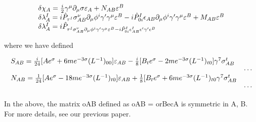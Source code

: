 \documentclass{article}
\begin{document}
\begin{equation}
\begin{array}{l l}{{\delta\chi_{A}=\frac{i}{2}\gamma^{\mu}\partial_{\mu}\sigma\varepsilon_{A}+N_{A B}\varepsilon^{B}}}\\ {{\delta\lambda_{A}^{I}=i\hat{P}_{\tau^{I}}\sigma_{A B}^{\nu}\partial_{\mu}\phi^{i}\gamma^{\prime}\gamma^{\mu}\varepsilon^{B}-i\hat{P}_{0i}^{I}\epsilon_{A B}\partial_{\mu}\phi^{i}\gamma^{\prime}\gamma^{\mu}\varepsilon^{B}+M_{A B}\varepsilon^{B}}}\\ {{\delta\lambda_{A}^{I}=i\hat{P}_{\tau^{I}\sigma_{A B}^{\nu}\partial_{\mu}\phi^{i}\gamma^{\prime}\gamma^{\mu}\varepsilon^{B}-i\hat{P}_{0i}^{I}\epsilon_{A B}^{I}\epsilon^{\prime}\gamma^{\prime}\epsilon^{B}}}}\end{array}
\end{equation}


where we have defined


\begin{equation}
\begin{array}{l l}{{S_{A B}=\frac{i}{24}[A e^{\sigma}+6m e^{-3\sigma}(L^{-1})_{00}]\varepsilon_{A B}-\frac{i}{8}[B_{t}e^{\sigma}-2m e^{-3\sigma}(L^{-1})_{t0}]\gamma^{7}\sigma_{A B}^{t}}}\\ {{\phantom{\qquad}}}&{{\cdots}}\\ {{N_{A B}=\frac{1}{24}[A e^{\sigma}-18m e^{-3\sigma}(L^{-1})_{t0}]\varepsilon_{A B}+\frac{1}{8}[B_{t}e^{\sigma}+6m e^{-3\sigma}(L^{-1})_{t0}\gamma^{7}\sigma_{A B}^{t}}}\\ {{\phantom{\qquad}}}&{{\cdots}}\end{array}
\end{equation}


In the above, the matrix oAB defined as oAB = orBecA is symmetric in A, B. For more
details, see our previous paper.
\end{document}
